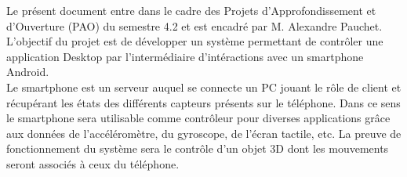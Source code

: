 
Le présent document entre dans le cadre des Projets d’Approfondissement
et d’Ouverture (PAO) du semestre 4.2 et est encadré par M. Alexandre Pauchet.
L'objectif du projet est de développer un système permettant de contrôler une application Desktop par l'intermédiaire d'intéractions avec un smartphone Android. \\
Le smartphone est un serveur auquel se connecte un PC jouant le rôle de client et récupérant les états des différents capteurs présents sur le téléphone. Dans ce sens le smartphone sera utilisable comme contrôleur pour diverses applications grâce aux données de l’accéléromètre, du gyroscope, de l’écran tactile, etc.
La preuve de fonctionnement du système sera le contrôle d'un objet 3D dont les mouvements seront associés à ceux du téléphone.